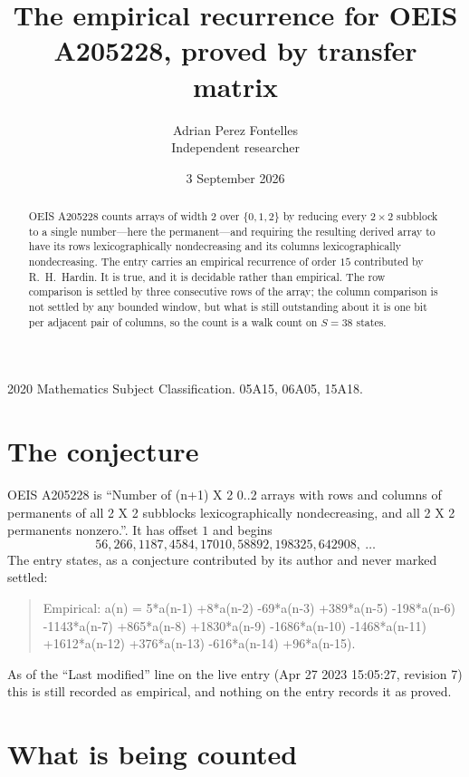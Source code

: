 \documentclass[11pt,a4paper]{article}
\title{The empirical recurrence for OEIS A205228, proved by transfer matrix}
\author{Adrian Perez Fontelles\\ \small Independent researcher}
\date{3 September 2026}
\theoremstyle{plain}
\theoremstyle{definition}
\begin{document}
\maketitle

\begin{abstract}
OEIS A205228 counts arrays of width $2$ over $\{0,1,2\}$ by reducing every $2\times2$ subblock to a
single number---here the permanent---and requiring the resulting derived array to have its rows
lexicographically nondecreasing and its columns lexicographically nondecreasing. The entry carries an
empirical recurrence of order $15$ contributed by R.~H.~Hardin. It is true, and it is
decidable rather than empirical. The row comparison is settled by three consecutive rows of the
array; the column comparison is not settled by any bounded window, but what is still outstanding
about it is one bit per adjacent pair of columns, so the count is a walk count on $S=38$
states.
\end{abstract}

\noindent\small 2020 Mathematics Subject Classification. 05A15, 06A05, 15A18.\normalsize

\section{The conjecture}

OEIS A205228 is ``Number of (n+1) X 2 0..2 arrays with rows and columns of permanents of all 2 X 2 subblocks lexicographically nondecreasing, and all 2 X 2 permanents nonzero.''. It has offset $1$ and begins
\[
56, 266, 1187, 4584, 17010, 58892, 198325, 642908,\ \dots
\]
The entry states, as a conjecture contributed by its author and never marked settled:
\begin{quote}
Empirical: a(n) = 5*a(n-1) +8*a(n-2) -69*a(n-3) +389*a(n-5) -198*a(n-6) -1143*a(n-7) +865*a(n-8) +1830*a(n-9) -1686*a(n-10) -1468*a(n-11) +1612*a(n-12) +376*a(n-13) -616*a(n-14) +96*a(n-15).
\end{quote}
As of the ``Last modified'' line on the live entry (Apr 27 2023 15:05:27, revision 7) this is still
recorded as empirical, and nothing on the entry records it as proved.

\section{What is being counted}
\end{document}
